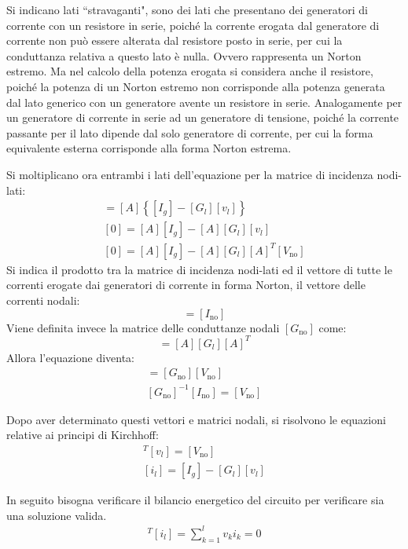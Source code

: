 \documentclass{article}
\numberwithin{equation}{subsection}
\begin{document}
Si indicano lati ``stravaganti", sono dei lati che presentano dei generatori di corrente con un resistore in serie, poiché la corrente erogata dal generatore di corrente non può 
essere alterata dal resistore posto in serie, per cui la conduttanza relativa a questo lato è nulla. Ovvero rappresenta un Norton estremo. Ma nel calcolo della potenza 
erogata si considera anche il resistore, poiché la potenza di un Norton estremo non corrisponde alla potenza generata dal lato generico con un generatore avente un resistore in 
serie. 
Analogamente per un generatore di corrente in serie ad un generatore di tensione, poiché la corrente passante per il lato dipende dal solo generatore di corrente, per cui la 
forma equivalente esterna corrisponde alla forma Norton estrema. 

Si moltiplicano ora entrambi i lati dell'equazione per la matrice di incidenza nodi-lati:
\begin{gather*}
    [A][i_l]=[A]\left\{[I_g]-[G_l][v_l]\right\}\\
    [0]=[A][I_g]-[A][G_l][v_l]\\
    [0]=[A][I_g]-[A][G_l][A]^T[V_\mathrm{no}]
\end{gather*}
Si indica il prodotto tra la matrice di incidenza nodi-lati ed il vettore di tutte le correnti erogate dai generatori di corrente in forma Norton, il vettore delle correnti 
nodali:
\begin{equation*}
    [A][I_g]=[I_\mathrm{no}]
\end{equation*}
Viene definita invece la matrice delle conduttanze nodali $[G_\mathrm{no}]$ come:
\begin{equation*}
    [G_\mathrm{no}]=[A][G_l][A]^T
\end{equation*}
Allora l'equazione diventa:
\begin{gather}
    [I_\mathrm{no}]=[G_\mathrm{no}][V_\mathrm{no}]\\
    [G_\mathrm{no}]^{-1}[I_\mathrm{no}]=[V_\mathrm{no}]
\end{gather}

Dopo aver determinato questi vettori e matrici nodali, si risolvono le equazioni relative ai principi di Kirchhoff: 
\begin{gather*}
    [A]^T[v_l]=[V_\mathrm{no}]\\
    [i_l]=[I_g]-[G_l][v_l]
\end{gather*}

In seguito bisogna verificare il bilancio energetico del circuito per verificare sia una soluzione valida. 
\begin{gather*}
    [v_l]^T[i_l]=\displaystyle\sum_{k=1}^lv_ki_k=0
\end{gather*}
\end{document}
